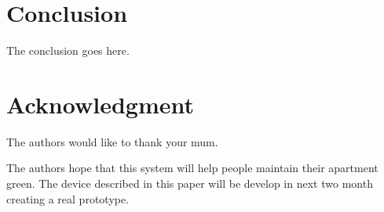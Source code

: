 \documentclass[conference]{IEEEtran}
\begin{document}

\begin{flushleft}
	
\section{Conclusion}
The conclusion goes here.

\section*{Acknowledgment}
The authors would like to thank your mum.


	The authors hope that this system will help people maintain their apartment green.
	The device described in this paper will be develop in  next two month creating a real prototype.
\end{flushleft}


\end{document}
